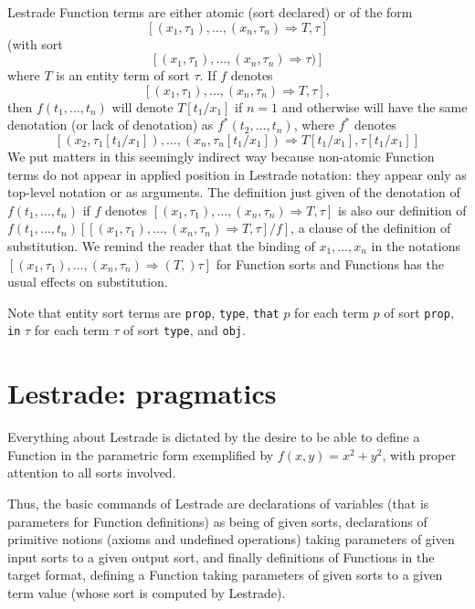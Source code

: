 \documentclass{article}
\begin{document}
Lestrade Function terms are either atomic (sort declared) or of the form $$[(x_1,\tau_1),\ldots,(x_n,\tau_n) \Rightarrow T,\tau]$$ (with sort  $$[(x_1,\tau_1),\ldots,(x_n,\tau_n) \Rightarrow \tau)]$$ where $T$ is an entity term of sort $\tau$.  If $f$ denotes  $$[(x_1,\tau_1),\ldots,(x_n,\tau_n) \Rightarrow T,\tau],$$
then $f(t_1,\ldots,t_n)$ will denote $T[t_1/x_1]$ if $n=1$ and otherwise will have the same denotation (or lack of denotation)  as $f^*(t_2,\ldots,t_n)$, where $f^*$ denotes
$$[(x_2,\tau_1[t_1/x_1]),\ldots,(x_n,\tau_n[t_1/x_1]) \Rightarrow T[t_1/x_1],\tau[t_1/x_1]]$$  We put matters in this seemingly indirect way because non-atomic Function terms do not appear in applied position in Lestrade notation:  they appear only as top-level notation or as arguments.  The definition just
given of the denotation of  $f(t_1,\ldots,t_n)$ if $f$ denotes  $[(x_1,\tau_1),\ldots,(x_n,\tau_n) \Rightarrow T,\tau]$ is also our definition of $f(t_1,\ldots,t_n)[[(x_1,\tau_1),\ldots,(x_n,\tau_n) \Rightarrow T,\tau]/f]$, a clause of the definition of substitution.  We remind the reader that the binding of $x_1,\ldots,x_n$ in the notations $[(x_1,\tau_1),\ldots,(x_n,\tau_n) \Rightarrow (T,)\tau]$ for Function sorts and Functions has the usual effects on substitution.

Note that entity sort terms are {\tt prop}, {\tt type}, {\tt that} $p$ for each term $p$ of sort {\tt prop}, {\tt in} $\tau$ for each term $\tau$ of sort
{\tt type}, and {\tt obj}.


\section{Lestrade:  pragmatics}

Everything about Lestrade is dictated by the desire to be able to define a Function in the parametric form exemplified by $f(x,y)=x^2+y^2$, with proper attention to all sorts involved.

Thus, the basic commands of Lestrade are declarations of variables (that is parameters for Function definitions) as being of given sorts, declarations of
primitive notions (axioms and undefined operations) taking parameters of given input sorts to a given output sort, and finally definitions of Functions in the target format, defining a Function taking parameters of given sorts to a given term value (whose sort is computed by Lestrade).
\end{document}
